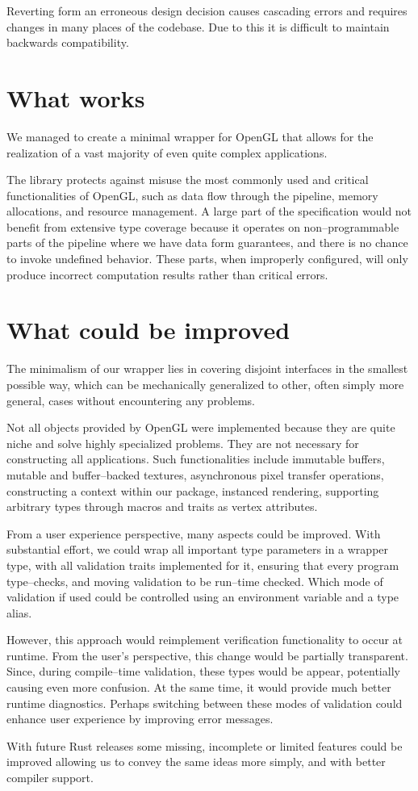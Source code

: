 Reverting form an erroneous design decision causes cascading errors and requires changes in many places of the codebase. Due to this it is difficult to maintain backwards compatibility.

\section{What works}

We managed to create a minimal wrapper for OpenGL that allows for the realization of a vast majority of even quite complex applications.

The library protects against misuse the most commonly used and critical functionalities of OpenGL, such as data flow through the pipeline, memory allocations, and resource management. 
A large part of the specification would not benefit from extensive type coverage because it operates on non--programmable parts of the pipeline where we have data form guarantees, 
and there is no chance to invoke undefined behavior. These parts, when improperly configured, will only produce incorrect computation results rather than critical errors. 

\section{What could be improved}

The minimalism of our wrapper lies in covering disjoint interfaces in the smallest possible way, which can be mechanically generalized to other, often simply more general, cases without encountering any problems.

Not all objects provided by OpenGL were implemented because they are quite niche and solve highly specialized problems. 
They are not necessary for constructing all applications. 
Such functionalities include immutable buffers, mutable and buffer--backed textures, asynchronous pixel transfer operations, constructing a context within our package, instanced rendering, supporting arbitrary types through macros and traits as vertex attributes.

From a user experience perspective, many aspects could be improved.
With substantial effort, we could wrap all important type parameters in a wrapper type, with all validation traits implemented for it, ensuring that every program type--checks,
and moving validation to be run--time checked. Which mode of validation if used could be controlled using an environment variable and a type alias.

However, this approach would reimplement verification functionality to occur at runtime. 
From the user's perspective, this change would be partially transparent. 
Since, during compile--time validation, these types would be appear, potentially causing even more confusion. 
At the same time, it would provide much better runtime diagnostics. 
Perhaps switching between these modes of validation could enhance user experience by improving error messages.

With future Rust releases some missing, incomplete or limited features could be improved allowing us to convey the same ideas more simply,
and with better compiler support.
